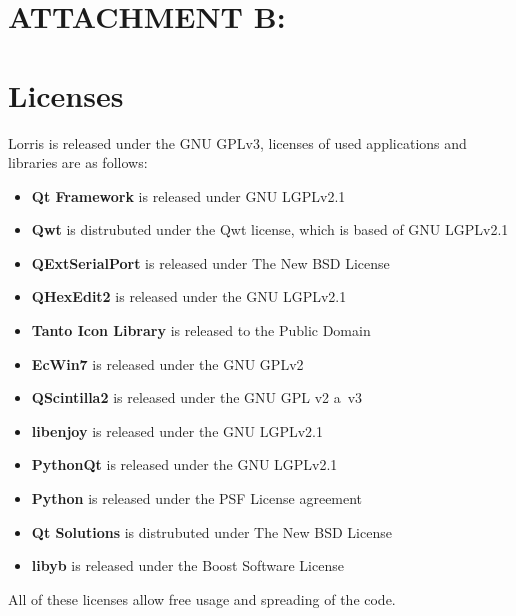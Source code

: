 \documentclass[12pt, a4paper, oneside]{article}
\begin{document}
\section*{ATTACHMENT B:}
\section*{Licenses}
Lorris is released under the GNU GPLv3\cite{gpl3}, licenses of used applications and libraries are as follows:
\begin{itemize}
    \item {\bf Qt Framework} is released under GNU LGPLv2.1\cite{lgpl}
    \item {\bf Qwt} is distrubuted under the Qwt license\cite{qwtlicense}, which is based of GNU LGPLv2.1
    \item {\bf QExtSerialPort} is released under The New BSD License\cite{newbsd}
    \item {\bf QHexEdit2} is released under the GNU LGPLv2.1
    \item {\bf Tanto Icon Library}\cite{tango} is released to the Public Domain
    \item {\bf EcWin7} is released under the GNU GPLv2
    \item {\bf QScintilla2} is released under the GNU GPL v2 a~v3
    \item {\bf libenjoy}\cite{libenjoy} is released under the  GNU LGPLv2.1
    \item {\bf PythonQt} is released under the GNU LGPLv2.1
    \item {\bf Python} is released under the PSF License agreement\cite{psf}
    \item {\bf Qt Solutions} is distrubuted under The New BSD License
    \item {\bf libyb} is released under the Boost Software License\cite{boost}
\end{itemize}

All of these licenses allow free usage and spreading of the code.

\newpage
\end{document}
